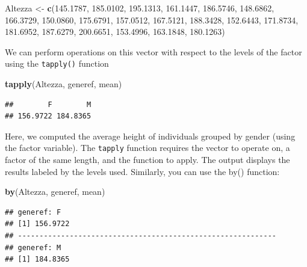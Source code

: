 \documentclass[
]{article}
\newenvironment{Shaded}{\begin{snugshade}}{\end{snugshade}}
\newcommand{\FloatTok}[1]{\textcolor[rgb]{0.00,0.00,0.81}{#1}}
\newcommand{\FunctionTok}[1]{\textcolor[rgb]{0.13,0.29,0.53}{\textbf{#1}}}
\newcommand{\NormalTok}[1]{#1}
\newcommand{\OtherTok}[1]{\textcolor[rgb]{0.56,0.35,0.01}{#1}}
\begin{document}
\begin{Shaded}
\begin{Highlighting}[]
\NormalTok{Altezza }\OtherTok{\textless{}{-}} \FunctionTok{c}\NormalTok{(}\FloatTok{145.1787}\NormalTok{, }\FloatTok{185.0102}\NormalTok{, }\FloatTok{195.1313}\NormalTok{, }\FloatTok{161.1447}\NormalTok{, }\FloatTok{186.5746}\NormalTok{, }\FloatTok{148.6862}\NormalTok{, }
             \FloatTok{166.3729}\NormalTok{, }\FloatTok{150.0860}\NormalTok{, }\FloatTok{175.6791}\NormalTok{, }\FloatTok{157.0512}\NormalTok{, }\FloatTok{167.5121}\NormalTok{, }\FloatTok{188.3428}\NormalTok{, }
             \FloatTok{152.6443}\NormalTok{, }\FloatTok{171.8734}\NormalTok{, }\FloatTok{181.6952}\NormalTok{, }\FloatTok{187.6279}\NormalTok{, }\FloatTok{200.6651}\NormalTok{, }\FloatTok{153.4996}\NormalTok{, }
             \FloatTok{163.1848}\NormalTok{, }\FloatTok{180.1263}\NormalTok{)}
\end{Highlighting}
\end{Shaded}

We can perform operations on this vector with respect to the levels of
the factor using the \texttt{tapply()} function

\begin{Shaded}
\begin{Highlighting}[]
\FunctionTok{tapply}\NormalTok{(Altezza, generef, mean)}
\end{Highlighting}
\end{Shaded}

\begin{verbatim}
##        F        M 
## 156.9722 184.8365
\end{verbatim}

Here, we computed the average height of individuals grouped by gender
(using the factor variable). The \texttt{tapply} function requires the
vector to operate on, a factor of the same length, and the function to
apply. The output displays the results labeled by the levels used.
Similarly, you can use the by() function:

\begin{Shaded}
\begin{Highlighting}[]
\FunctionTok{by}\NormalTok{(Altezza, generef, mean)}
\end{Highlighting}
\end{Shaded}

\begin{verbatim}
## generef: F
## [1] 156.9722
## ------------------------------------------------------------ 
## generef: M
## [1] 184.8365
\end{verbatim}
\end{document}
